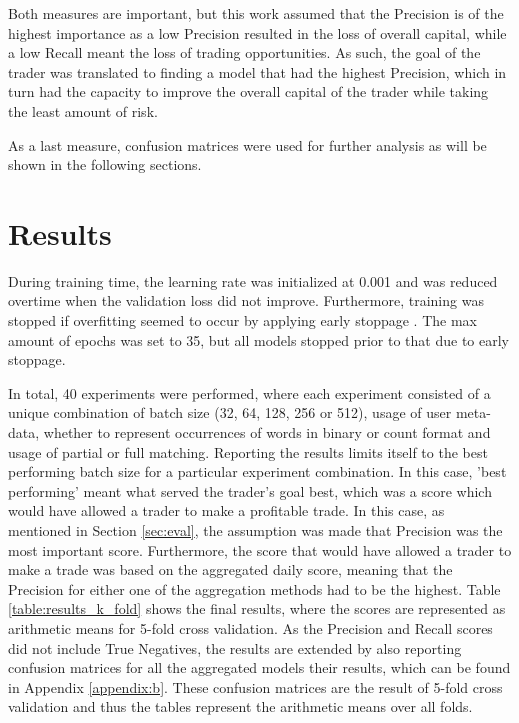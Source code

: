 \documentclass[sigconf]{acmart-txmm}
\begin{document}
Both measures are important, but this work assumed that the Precision is of the highest importance as a low Precision resulted in the loss of overall capital, while a low Recall meant the loss of trading opportunities. As such, the goal of the trader was translated to finding a model that had the highest Precision, which in turn had the capacity to improve the overall capital of the trader while taking the least amount of risk.

As a last measure, confusion matrices were used for further analysis as will be shown in the following sections.

\section{Results}
During training time, the learning rate was initialized at 0.001 and was reduced overtime when the validation loss did not improve. Furthermore, training was stopped if overfitting seemed to occur by applying early stoppage \cite{hofmann2001unsupervised}. The max amount of epochs was set to 35, but all models stopped prior to that due to early stoppage.

In total, 40 experiments were performed, where each experiment consisted of a unique combination of batch size (32, 64, 128, 256 or 512), usage of user meta-data, whether to represent occurrences of words in binary or count format and usage of partial or full matching. Reporting the results limits itself to the best performing batch size for a particular experiment combination. In this case, 'best performing' meant what served the trader's goal best, which was a score which would have allowed a trader to make a profitable trade. In this case, as mentioned in Section \ref{sec:eval}, the assumption was made that Precision was the most important score. Furthermore, the score that would have allowed a trader to make a trade was based on the aggregated daily score, meaning that the Precision for either one of the aggregation methods had to be the highest. Table \ref{table:results_k_fold} shows the final results, where the scores are represented as arithmetic means for 5-fold cross validation. As the Precision and Recall scores did not include True Negatives, the results are extended by also reporting confusion matrices for all the aggregated models their results, which can be found in Appendix \ref{appendix:b}. These confusion matrices are the result of 5-fold cross validation and thus the tables represent the arithmetic means over all folds.
\end{document}
